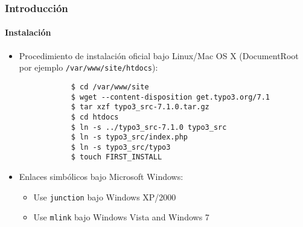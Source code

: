 \begin{frame}[fragile]
	\frametitle{Introducción}
	\framesubtitle{Instalación}

	\begin{itemize}
		\item Procedimiento de instalación oficial bajo Linux/Mac OS X\newline
			(DocumentRoot por ejemplo \texttt{/var/www/site/htdocs}):
		\begin{lstlisting}
			$ cd /var/www/site
			$ wget --content-disposition get.typo3.org/7.1
			$ tar xzf typo3_src-7.1.0.tar.gz
			$ cd htdocs
			$ ln -s ../typo3_src-7.1.0 typo3_src
			$ ln -s typo3_src/index.php
			$ ln -s typo3_src/typo3
			$ touch FIRST_INSTALL
		\end{lstlisting}

		\item Enlaces simbólicos bajo Microsoft Windows:

			\begin{itemize}
				\item Use \texttt{junction} bajo Windows XP/2000
				\item Use \texttt{mlink} bajo Windows Vista and Windows 7
			\end{itemize}

	\end{itemize}
\end{frame}


